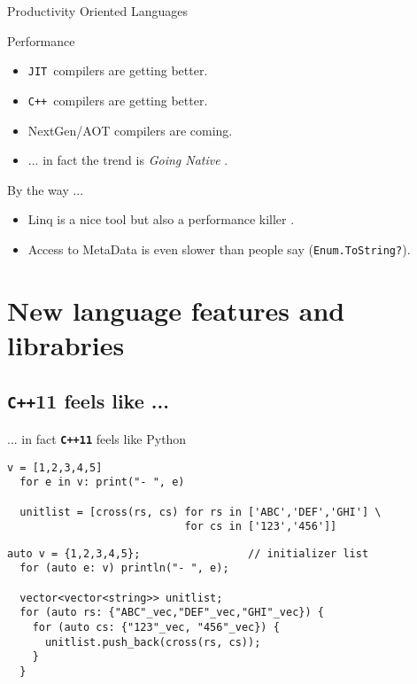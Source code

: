 \documentclass[svgnames,smaller]{beamer}
\newcommand*{\cpp}{\texttt{C++}}
\newcommand*{\jit}{\texttt{JIT}}
\begin{document}
\begin{frame}[fragile]{Productivity Oriented Languages}
  \begin{block}{Performance}
    \begin{itemize}
    \item \jit\ compilers are getting better.
    \item \cpp\ compilers are getting better.
    \item NextGen/AOT compilers are coming.
    \item ... in fact the trend is \textit{Going Native} \cite{Ms-going-native}.
    \end{itemize}
  \end{block}

  \begin{alertblock}{By the way ...}
    \begin{itemize}
    \item Linq is a nice tool but also a performance killer \footnotemark .
    \item Access to MetaData is even slower than people say (\texttt{Enum.ToString?}).
    \end{itemize}
  \end{alertblock}
\end{frame}

\section{New  language features and librabries}

\subsection{\cpp11 feels like ...}

\begin{frame}[fragile]{... in fact \textbf{\texttt{C++11}} feels like Python}
  \begin{lstlisting}[title={python3}]
  v = [1,2,3,4,5]
  for e in v: print("- ", e)

  unitlist = [cross(rs, cs) for rs in ['ABC','DEF','GHI'] \ 
                            for cs in ['123','456']]

  \end{lstlisting}
  \begin{lstlisting}[title={\cpp11}]
  auto v = {1,2,3,4,5};                 // initializer list
  for (auto e: v) println("- ", e);

  vector<vector<string>> unitlist;
  for (auto rs: {"ABC"_vec,"DEF"_vec,"GHI"_vec}) {
    for (auto cs: {"123"_vec, "456"_vec}) {
      unitlist.push_back(cross(rs, cs));
    }
  }
  \end{lstlisting}
\end{frame}
\end{document}
